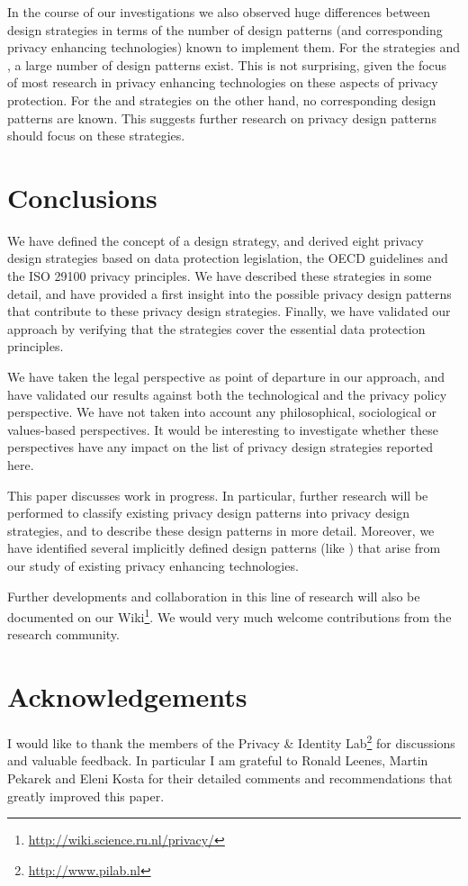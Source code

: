 In the course of our investigations we also observed huge differences
between design strategies in terms of the number of design patterns (and corresponding privacy enhancing technologies) known to implement them. For the strategies  and , a large number of design patterns exist. This is not surprising, given the focus of most research in privacy enhancing technologies on these aspects of privacy protection. For the  and  strategies on the other hand, no corresponding design patterns are known. This suggests further research on privacy design patterns should focus on these strategies.


\section{Conclusions}
\label{sec-concl}


We have defined the concept of a design strategy, and derived eight privacy design strategies based on data protection legislation, the OECD guidelines
and the ISO 29100 privacy principles. We have described these strategies in some detail, and have provided a first insight into the possible privacy design patterns that contribute to these privacy design strategies. Finally, we have validated our approach by verifying that the strategies cover the essential data protection principles.

We have taken the legal perspective as point of departure in our approach, and have validated our results against both the technological and the privacy policy perspective. We have not taken into account any philosophical, sociological or values-based perspectives. It would be interesting to investigate whether these perspectives have any impact on the list of privacy design strategies reported here.

This paper discusses work in progress. In particular, further research will be performed to classify existing privacy design patterns into privacy design strategies, and to describe these design patterns in more detail. Moreover, we have identified several implicitly defined design patterns (like ) that arise from our study of existing privacy enhancing technologies. 

Further developments and collaboration in this line of research will also be documented on our Wiki\footnote{\url{http://wiki.science.ru.nl/privacy/}
}. 
We would very much welcome contributions from the research community.

\section{Acknowledgements}

I would like to thank the members of the Privacy \& Identity Lab\footnote{\url{http://www.pilab.nl}
}
for discussions and valuable feedback. In particular I am grateful to Ronald Leenes, Martin Pekarek and Eleni Kosta for their detailed comments and recommendations that greatly improved this paper.

